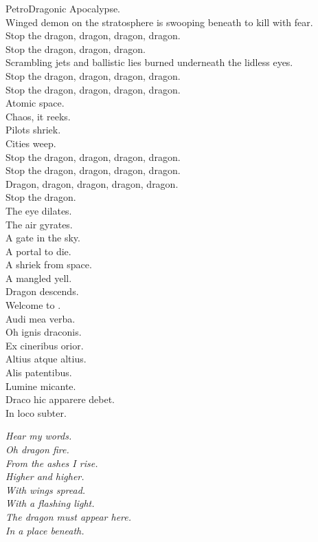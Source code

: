 PetroDragonic Apocalypse. \\

Winged demon on the stratosphere is swooping beneath to kill with fear. \\
Stop the dragon, dragon, dragon, dragon. \\
Stop the dragon, dragon, dragon. \\
Scrambling jets and ballistic lies burned underneath the lidless eyes. \\
Stop the dragon, dragon, dragon, dragon. \\
Stop the dragon, dragon, dragon, dragon. \\
Atomic space. \\
Chaos, it reeks. \\
Pilots shriek. \\
Cities weep. \\
Stop the dragon, dragon, dragon, dragon. \\
Stop the dragon, dragon, dragon, dragon. \\
Dragon, dragon, dragon, dragon, dragon. \\
Stop the dragon. \\

The eye dilates. \\
The air gyrates. \\
A gate in the sky. \\
A portal to die. \\
A shriek from space. \\
A mangled yell. \\
Dragon descends. \\
Welcome to . \\

Audi mea verba. \\
Oh ignis draconis. \\
Ex cineribus orior. \\
Altius atque altius. \\
Alis patentibus. \\
Lumine micante. \\
Draco hic apparere debet. \\
In loco subter. \\


{\itshape%
Hear my words. \\
Oh dragon fire. \\
From the ashes I rise. \\
Higher and higher. \\
With wings spread. \\
With a flashing light. \\
The dragon must appear here. \\
In a place beneath. \\
}

